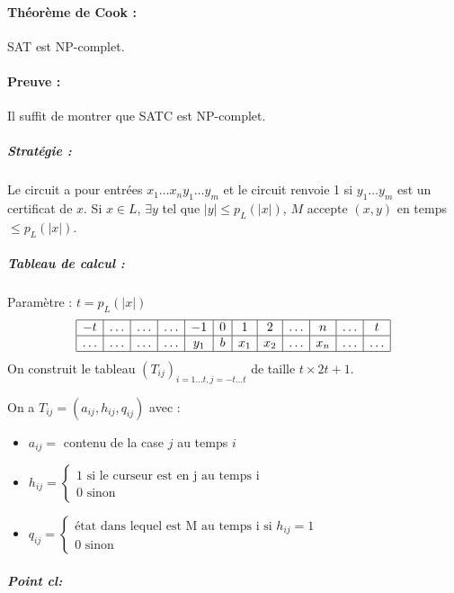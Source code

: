 \documentclass[12pt,a4paper]{report}
\begin{document}
\paragraph{Théorème de Cook :\\}
SAT est NP-complet.
\paragraph{Preuve :\\}
Il suffit de montrer que SATC est NP-complet.
\subparagraph{Stratégie :\\}
Le circuit a pour entrées $x_1 \ldots x_n y_1 \ldots y_m $ et le circuit renvoie 1 si $y_1 \ldots y_m$ est un certificat de $x$. Si $x \in L$, $ \exists y$ tel que $|y|\leqslant p_L(|x|)$, $M$ accepte $(x,y)$ en temps $\leqslant p_L(|x|)$.
\subparagraph{Tableau de calcul :\\}
Paramètre : $t=p_L(|x|)$
$$\begin{array}{|c|c|c|c|c|c|c|c|c|c|c|c|} \hline
-t & \ldots & \ldots & \ldots & -1 & 0& 1 & 2 & \ldots & n & \ldots  & t \\\hline
 \ldots & \ldots & \ldots & \ldots & y_1 & b & x_1 & x_2 & \ldots & x_n &  \ldots & \ldots \\\hline
\end{array}$$
On construit le tableau $(T_{ij})_{i=1\ldots t, j = -t \ldots t} $ de taille $t \times 2t+1$.

\begin{figure}[h]
	\centering
  \scalebox{0.5}{}
\end{figure}

On a $T_{ij} =(a_{ij}, h_{ij}, q_{ij})$ avec :
\begin{itemize}
\item $a_{ij} =$ contenu de la case $j$ au temps $i$
\item $h_{ij} = \left\{ \begin{array}{l}
1 \mbox{ si le curseur est en j au temps i } \\
0 \mbox{ sinon} \end{array} \right. $
\item $q_{ij} =  \left\{ \begin{array}{l}
\mbox{état dans lequel est M au temps i si } h_{ij}=1 \\
0 \mbox{ sinon} \end{array} \right. $
\end{itemize}

\subparagraph{Point cl: \\}
\end{document}
